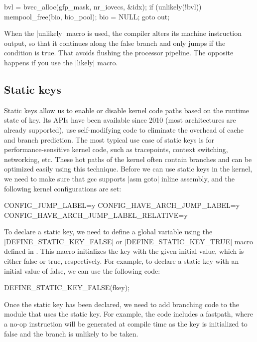 \documentclass[10pt, oneside]{book}
\begin{document}
\begin{code}
bvl = bvec_alloc(gfp_mask, nr_iovecs, &idx);
if (unlikely(!bvl)) {
    mempool_free(bio, bio_pool);
    bio = NULL;
    goto out;
}
\end{code}

When the \cpp|unlikely| macro is used, the compiler alters its machine instruction output, so that it continues along the false branch and only jumps if the condition is true.
That avoids flushing the processor pipeline.
The opposite happens if you use the \cpp|likely| macro.

\subsection{Static keys}
\label{sec:static_keys}
Static keys allow us to enable or disable kernel code paths based on the runtime state of key. Its APIs have been available since 2010 (most architectures are already supported), use self-modifying code to eliminate the overhead of cache and branch prediction.
The most typical use case of static keys is for performance-sensitive kernel code, such as tracepoints, context switching, networking, etc. These hot paths of the kernel often contain branches and can be optimized easily using this technique.
Before we can use static keys in the kernel, we need to make sure that gcc supports \cpp|asm goto| inline assembly, and the following kernel configurations are set:

\begin{code}
CONFIG_JUMP_LABEL=y
CONFIG_HAVE_ARCH_JUMP_LABEL=y
CONFIG_HAVE_ARCH_JUMP_LABEL_RELATIVE=y
\end{code}

To declare a static key, we need to define a global variable using the \cpp|DEFINE_STATIC_KEY_FALSE| or \cpp|DEFINE_STATIC_KEY_TRUE| macro defined in .
This macro initializes the key with the given initial value, which is either false or true, respectively. For example, to declare a static key with an initial value of false, we can use the following code:

\begin{code}
DEFINE_STATIC_KEY_FALSE(fkey);
\end{code}

Once the static key has been declared, we need to add branching code to the module that uses the static key.
For example, the code includes a fastpath, where a no-op instruction will be generated at compile time as the key is initialized to false and the branch is unlikely to be taken.
\end{document}

